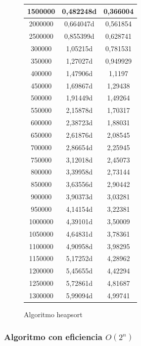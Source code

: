 \documentclass[12pt,spanish]{article}
\begin{document}
\begin{figure}[H]
\begin{tabular}{|c|c|c|}
\hline
1500000 & 0,482248d & 0,366004\\
\hline
2000000 & 0,664047d & 0,561854\\
\hline
2500000 & 0,855399d & 0,628741\\
\hline
300000 & 1,05215d & 0,781531\\
\hline
350000 & 1,27027d & 0,949929\\
\hline
400000 & 1,47906d & 1,1197\\
\hline
450000 & 1,69867d & 1,29438\\
\hline
500000 & 1,91449d & 1,49264\\
\hline
550000 & 2,15878d & 1,70317\\
\hline
600000 & 2,38723d & 1,88031\\
\hline
650000 & 2,61876d & 2,08545\\
\hline
700000 & 2,86654d & 2,25945\\
\hline
750000 & 3,12018d & 2,45073\\
\hline
800000 & 3,39958d & 2,73144\\
\hline
850000 & 3,63556d & 2,90442\\
\hline
900000 & 3,90373d & 3,03281\\
\hline
950000 & 4,14154d & 3,22381\\
\hline
1000000 & 4,39101d & 3,50009\\
\hline
1050000 & 4,64831d & 3,78361\\
\hline
1100000 & 4,90958d & 3,98295\\
\hline
1150000 & 5,17252d & 4,28962\\
\hline
1200000 & 5,45655d & 4,42294\\
\hline
1250000 & 5,72861d & 4,81687\\
\hline
1300000 & 5,99094d & 4,99741\\
\hline
\end{tabular}
\caption{Algoritmo heapsort}
\end{figure}

\subsubsection{Algoritmo con eficiencia $O(2^n)$}
\end{document}
